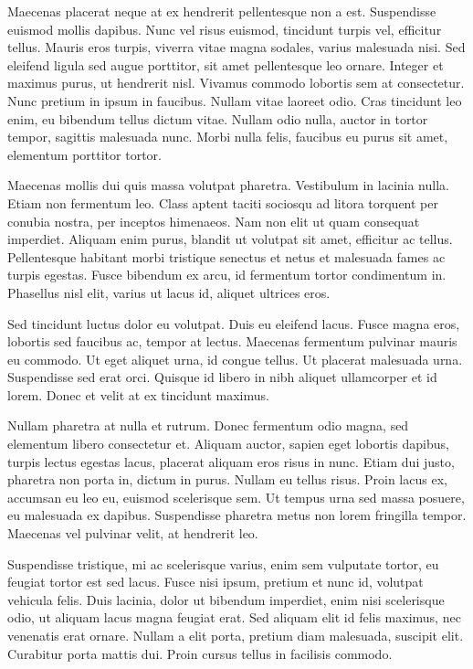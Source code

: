 Maecenas placerat neque at ex hendrerit pellentesque non a est. Suspendisse euismod mollis dapibus. Nunc vel risus euismod, tincidunt turpis vel, efficitur tellus. Mauris eros turpis, viverra vitae magna sodales, varius malesuada nisi. Sed eleifend ligula sed augue porttitor, sit amet pellentesque leo ornare. Integer et maximus purus, ut hendrerit nisl. Vivamus commodo lobortis sem at consectetur. Nunc pretium in ipsum in faucibus. Nullam vitae laoreet odio. Cras tincidunt leo enim, eu bibendum tellus dictum vitae. Nullam odio nulla, auctor in tortor tempor, sagittis malesuada nunc. Morbi nulla felis, faucibus eu purus sit amet, elementum porttitor tortor.

Maecenas mollis dui quis massa volutpat pharetra. Vestibulum in lacinia nulla. Etiam non fermentum leo. Class aptent taciti sociosqu ad litora torquent per conubia nostra, per inceptos himenaeos. Nam non elit ut quam consequat imperdiet. Aliquam enim purus, blandit ut volutpat sit amet, efficitur ac tellus. Pellentesque habitant morbi tristique senectus et netus et malesuada fames ac turpis egestas. Fusce bibendum ex arcu, id fermentum tortor condimentum in. Phasellus nisl elit, varius ut lacus id, aliquet ultrices eros.

Sed tincidunt luctus dolor eu volutpat. Duis eu eleifend lacus. Fusce magna eros, lobortis sed faucibus ac, tempor at lectus. Maecenas fermentum pulvinar mauris eu commodo. Ut eget aliquet urna, id congue tellus. Ut placerat malesuada urna. Suspendisse sed erat orci. Quisque id libero in nibh aliquet ullamcorper et id lorem. Donec et velit at ex tincidunt maximus.

Nullam pharetra at nulla et rutrum. Donec fermentum odio magna, sed elementum libero consectetur et. Aliquam auctor, sapien eget lobortis dapibus, turpis lectus egestas lacus, placerat aliquam eros risus in nunc. Etiam dui justo, pharetra non porta in, dictum in purus. Nullam eu tellus risus. Proin lacus ex, accumsan eu leo eu, euismod scelerisque sem. Ut tempus urna sed massa posuere, eu malesuada ex dapibus. Suspendisse pharetra metus non lorem fringilla tempor. Maecenas vel pulvinar velit, at hendrerit leo.

Suspendisse tristique, mi ac scelerisque varius, enim sem vulputate tortor, eu feugiat tortor est sed lacus. Fusce nisi ipsum, pretium et nunc id, volutpat vehicula felis. Duis lacinia, dolor ut bibendum imperdiet, enim nisi scelerisque odio, ut aliquam lacus magna feugiat erat. Sed aliquam elit id felis maximus, nec venenatis erat ornare. Nullam a elit porta, pretium diam malesuada, suscipit elit. Curabitur porta mattis dui. Proin cursus tellus in facilisis commodo.


